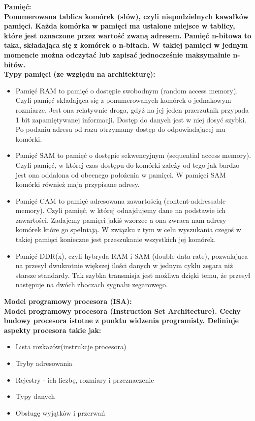 \documentclass[a4paper,12pt]{article}
\newcommand{\h}[1]{\noindent \bf #1 \rm \\ \noindent}
\begin{document}
\h{Pamięć:}
Ponumerowana tablica komórek (słów), czyli niepodzielnych kawałków pamięci. Każda komórka w pamięci ma ustalone miejsce w tablicy, które jest oznaczone przez wartość zwaną adresem. Pamięć n-bitowa to taka, składająca się z komórek o n-bitach. W takiej pamięci w jednym momencie można odczytać lub zapisać jednocześnie maksymalnie n-bitów.\\

\h{Typy pamięci (ze względu na architekturę):}
\begin{itemize}
	\item Pamięć RAM to pamięć o dostępie swobodnym (random access memory). Czyli pamięć składająca się z ponumerowanych komórek o jednakowym rozmiarze.  Jest ona relatywnie droga, gdyż na jej jeden przerzutnik przypada 1 bit zapamiętywanej informacji. Dostęp do danych jest w niej dosyć szybki. Po podaniu adresu od razu otrzymamy dostęp do odpowiadającej mu komórki.
	
	\item Pamięć SAM to pamięć o dostępie sekwencyjnym (sequential access memory). Czyli pamięć, w której czas dostępu do komórki zależy od tego jak bardzo jest ona oddalona od obecnego położenia w pamięci. W pamięci SAM komórki również mają przypisane adresy.
	
	\item Pamięć CAM to pamięć adresowana zawartością (content-addressable memory). Czyli pamięć, w której odnajdujemy dane na podstawie ich zawartości. Zadajemy pamięci jakiś wzorzec a ona zwraca nam adresy komórek które go spełniają. W związku z tym w celu wyszukania czegoś w takiej pamięci konieczne jest przeszukanie wszystkich jej komórek.
	
	\item Pamięć DDR(x), czyli hybryda RAM i SAM (double data rate), pozwalająca na przesył dwukrotnie większej ilości danych w jednym cyklu zegara niż starsze standardy. Tak szybka transmisja jest możliwa dzięki temu, że przesył następuje na dwóch zboczach sygnału zegarowego.
\end{itemize}

\h{Model programowy procesora (ISA):}
Model programowy procesora (Instruction Set Architecture). Cechy budowy procesora istotne z punktu widzenia programisty. Definiuje aspekty procesora takie jak:
\begin{itemize}
	\item Lista rozkazów(instrukcje procesora)
	\item Tryby adresowania
	\item Rejestry - ich liczbę, rozmiary i przeznaczenie
	\item Typy danych
	\item Obsługę wyjątków i przerwań
\end{itemize}
\end{document}
